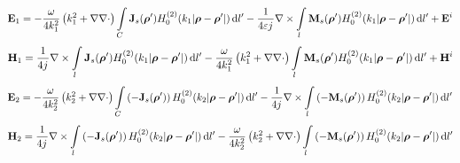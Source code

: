 \documentclass{ieeeaccess}
\renewcommand{\v}[1]{\mathbf{#1}} %
\renewcommand{\O}{\omega}  %
\newcommand{\E}{\varepsilon}  %
\newcommand{\p}{\rho}  %
\newcommand{\vp}{\boldsymbol \p}  %
\newcommand{\x}{\times}  %
\renewcommand{\del}{\nabla}  %
\renewcommand{\^}{\hat}  %
\newcommand*\diff{\mathop{}\!\mathrm{d}} %
\renewcommand{\j}{{j}\mkern1mu} %
\begin{document}
\begin{figure}[!t]
\normalsize
\setcounter{MYtempeqncnt}{\value{equation}}
\setcounter{equation}{8}
\begin{equation}
\label{eq:E1scatt}
\v E_1 =
    -\frac{\O}{4 k_1^2} \left( k_1^2 + \del \del \cdot \right) \int\limits_{C} \v J_s(\vp') H_0^{(2)}(k_1 |\vp - \vp'|) \diff{l'}
    - \frac{1}{4 \E \j} \del \x \int\limits_{l} \v M_s(\vp') H_0^{(2)}(k_1 |\vp - \vp'|) \diff{l'} + \v E^i
\end{equation}
\begin{equation}
\label{eq:H1scatt}
    \v H_1 =
    \frac{1}{4 \j} \del \x \int\limits_{l} \v J_s(\vp') H_0^{(2)}(k_1 |\vp - \vp'|) \diff{l'} 
    -\frac{\O}{4 k_1^2} \left( k_1^2 + \del \del \cdot \right) \int\limits_{l} \v M_s(\vp') H_0^{(2)}(k_1 |\vp - \vp'|) \diff{l'} + \v H^i
\end{equation}
\begin{equation}
\label{eq:E2scatt}
    \v E_2 = 
    -\frac{\O}{4 k_2^2} \left( k_2^2 + \del \del \cdot \right) \int\limits_{C} \left(-\v J_s(\vp')\right) H_0^{(2)}(k_2 |\vp - \vp'|) \diff{l'}
    - \frac{1}{4 \j} \del \x \int\limits_{l} \left(-\v M_s(\vp')\right) H_0^{(2)}(k_2 |\vp - \vp'|) \diff{l'}
\end{equation}
\begin{equation}
\label{eq:H2scatt}
    \v H_2 =
    \frac{1}{4 \j} \del \x \int\limits_{l} \left(-\v J_s(\vp')\right) H_0^{(2)}(k_2 |\vp - \vp'|) \diff{l'} 
    -\frac{\O}{4 k_2^2} \left( k_2^2 + \del \del \cdot \right) \int\limits_{l} \left(-\v M_s(\vp')\right) H_0^{(2)}(k_2 |\vp - \vp'|) \diff{l'}
\end{equation}
\setcounter{equation}{\value{MYtempeqncnt}}
\hrulefill
\end{figure}
\end{document}

